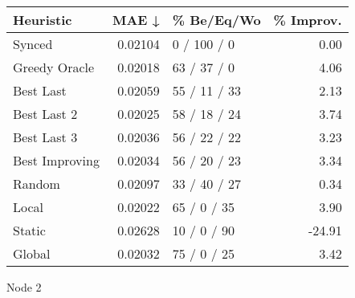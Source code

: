 \begin{tabular}{lrlr}
\toprule
\textbf{Heuristic} & \textbf{MAE ↓} & \textbf{\% Be/Eq/Wo} & \textbf{\% Improv.} \\
\midrule
            Synced &        0.02104 &          0 / 100 / 0 &                0.00 \\
     Greedy Oracle &        0.02018 &          63 / 37 / 0 &                4.06 \\
         Best Last &        0.02059 &         55 / 11 / 33 &                2.13 \\
       Best Last 2 &        0.02025 &         58 / 18 / 24 &                3.74 \\
       Best Last 3 &        0.02036 &         56 / 22 / 22 &                3.23 \\
    Best Improving &        0.02034 &         56 / 20 / 23 &                3.34 \\
            Random &        0.02097 &         33 / 40 / 27 &                0.34 \\
             Local &        0.02022 &          65 / 0 / 35 &                3.90 \\
            Static &        0.02628 &          10 / 0 / 90 &              -24.91 \\
            Global &        0.02032 &          75 / 0 / 25 &                3.42 \\
\bottomrule
\end{tabular}
\caption{Node 2}
\label{tab:iid_lr01_le2_bs4_2}
